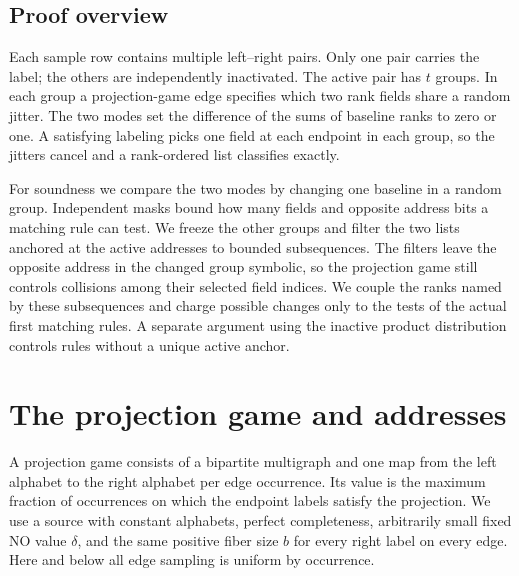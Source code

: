 \documentclass[11pt]{article}
\begin{document}
\subsection{Proof overview}

Each sample row contains multiple left--right pairs. Only one pair carries the
label; the others are independently inactivated. The active pair has $t$ groups.
In each group a projection-game edge specifies which two rank fields share a
random jitter. The two modes set the difference of the sums of baseline ranks
to zero or one. A satisfying labeling picks one field at each endpoint in each
group, so the jitters cancel and a rank-ordered list classifies exactly.

For soundness we compare the two modes by changing one baseline in a random
group. Independent masks bound how many fields and opposite address bits a
matching rule can test. We freeze the other groups and filter the two
lists anchored at the active addresses to bounded subsequences. The filters
leave the opposite address in the changed group symbolic, so the projection
game still controls collisions among their selected field indices. We couple
the ranks named by these subsequences and charge possible changes only to the
tests of the actual first matching rules. A separate argument using the
inactive product distribution controls rules without a unique active anchor.

\section{The projection game and addresses}\label{sec:source}

A projection game consists of a bipartite multigraph and one map from the
left alphabet to the right alphabet per edge occurrence. Its value is the
maximum fraction of occurrences on which the endpoint labels satisfy the
projection. We use a source with constant alphabets, perfect completeness,
arbitrarily small fixed NO value $\delta$, and the same positive fiber size
$b$ for every right label on every edge. Here and below all edge sampling
is uniform by occurrence.
\end{document}
